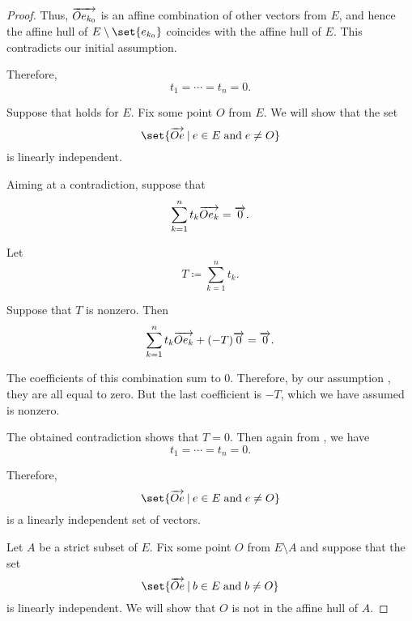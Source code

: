 \begin{proof}
  Thus, \( \overrightarrow{O e_{k_0}} \) is an affine combination of other vectors from \( E \), and hence the affine hull of \( E \setminus \set{ e_{k_0} } \) coincides with the affine hull of \( E \). This contradicts our initial assumption.

  Therefore,
  \begin{equation*}
    t_1 = \cdots = t_n = 0.
  \end{equation*}

   Suppose that  holds for \( E \). Fix some point \( O \) from \( E \). We will show that the set
  \begin{equation*}
    \set{ \vect{O e} \given e \in E \T{and} e \neq O }
  \end{equation*}
  is linearly independent.

  Aiming at a contradiction, suppose that
  \begin{equation*}
    \sum_{k=1}^n t_k \overrightarrow{O e_k} = \overrightarrow{0}.
  \end{equation*}

  Let
  \begin{equation*}
    T \coloneqq \sum_{k=1}^n t_k.
  \end{equation*}

  Suppose that \( T \) is nonzero. Then
  \begin{equation*}
    \sum_{k=1}^n t_k \overrightarrow{O e_k} + (-T) \overrightarrow{0} = \overrightarrow{0}.
  \end{equation*}

  The coefficients of this combination sum to \( 0 \). Therefore, by our assumption , they are all equal to zero. But the last coefficient is \( -T \), which we have assumed is nonzero.

  The obtained contradiction shows that \( T = 0 \). Then again from , we have
  \begin{equation*}
    t_1 = \cdots = t_n = 0.
  \end{equation*}

  Therefore,
  \begin{equation*}
    \set{ \vect{O e} \given e \in E \T{and} e \neq O }
  \end{equation*}
  is a linearly independent set of vectors.

   Let \( A \) be a strict subset of \( E \). Fix some point \( O \) from \( E \setminus A \) and suppose that the set
  \begin{equation*}
    \set{ \vect{O e} \given b \in E \T{and} b \neq O }
  \end{equation*}
  is linearly independent. We will show that \( O \) is not in the affine hull of \( A \).


\end{proof}
